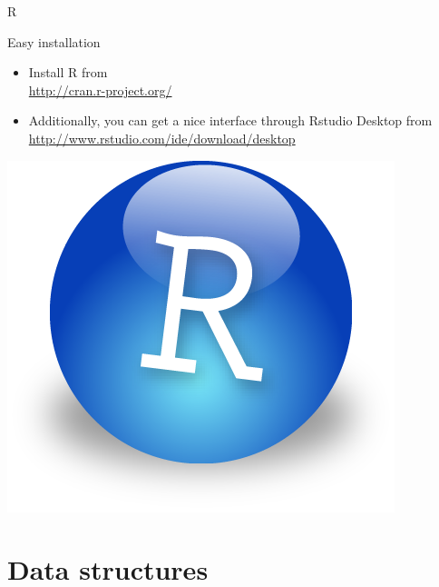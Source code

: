 \documentclass[10pt]{beamer}
\begin{document}
\begin{frame}{R}
  \begin{block}{Easy installation}
    \begin{itemize}
    \item Install R from  \\ \url{http://cran.r-project.org/}
      \bigskip
    \item Additionally, you can get a nice interface through Rstudio Desktop from \\ \url{http://www.rstudio.com/ide/download/desktop}
    \end{itemize}
  \end{block}
  \centering
  \bigskip
  \includegraphics[page=1,height=.3\textheight]{imgs/Rstudio.png}

\end{frame}



\section{Data structures}
\end{document}

